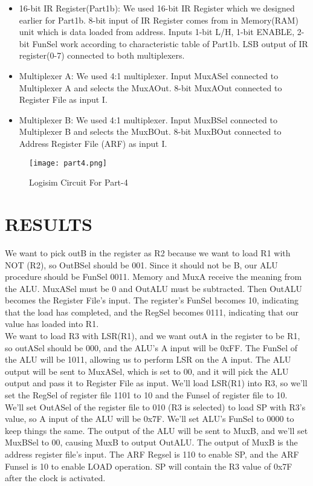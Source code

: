 \documentclass[pdftex,12pt,a4paper]{article}
\begin{document}
\begin{itemize}
\item 16-bit IR Register(Part1b): We used 16-bit IR Register which we designed earlier for Part1b. 8-bit input of IR Register comes from in Memory(RAM) unit which is data loaded from address. Inputs 1-bit L/H, 1-bit ENABLE, 2-bit FunSel work according to characteristic table of Part1b. LSB output of IR register(0-7) connected to both multiplexers.
\item Multiplexer A: We used 4:1 multiplexer. Input MuxASel connected to Multiplexer A and selects the MuxAOut. 8-bit MuxAOut connected to Register File as input I.
\item Multiplexer B: We used 4:1 multiplexer. Input MuxBSel connected to Multiplexer B and selects the MuxBOut. 8-bit MuxBOut connected to Address Register File (ARF) as input I.
\end{itemize}



\begin{figure}[H]
	\centering
	\texttt{[image: part4.png]}	
	\caption{Logisim Circuit For Part-4}
	\label{fig12}
\end{figure}

\section{RESULTS }
We want to pick outB in the register as R2 because we want to load R1 with NOT (R2), so OutBSel should be 001. Since it should not be B, our ALU procedure should be FunSel 0011. Memory and MuxA receive the meaning from the ALU. MuxASel must be 0 and OutALU must be subtracted. Then OutALU becomes the Register File's input. The register's FunSel becomes 10, indicating that the load has completed, and the RegSel becomes 0111, indicating that our value has loaded into R1. \\

\noindent We want to load R3 with LSR(R1), and we want outA in the register to be R1, so outASel should be 000, and the ALU's A input will be 0xFF. The FunSel of the ALU will be 1011, allowing us to perform LSR on the A input. The ALU output will be sent to MuxASel, which is set to 00, and it will pick the ALU output and pass it to Register File as input. We'll load LSR(R1) into R3, so we'll set the RegSel of register file 1101 to 10 and the Funsel of register file to 10. \\

\noindent    We'll set OutASel of the register file to 010 (R3 is selected) to load SP with R3's value, so A input of the ALU will be 0x7F. We'll set ALU's FunSel to 0000 to keep things the same. The output of the ALU will be sent to MuxB, and we'll set MuxBSel to 00, causing MuxB to output OutALU. The output of MuxB is the address register file's input. The ARF Regsel is 110 to enable SP, and the ARF Funsel is 10 to enable LOAD operation. SP will contain the R3 value of 0x7F after the clock is activated.
\end{document}
